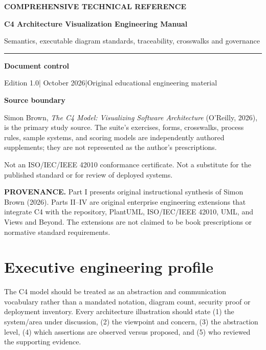 \documentclass[10pt,letterpaper]{article}
\newcommand{\SourceNote}[1]{\par\smallskip\noindent\colorbox{C4Light}{\parbox{0.94\linewidth}{\footnotesize\textbf{PROVENANCE.} #1}}\par\medskip}
\newcommand{\DocStart}[3]{%
\begin{document}
\begin{titlepage}
\renewcommand{\thepage}{title-\arabic{page}}
\vspace*{0.55in}
{\sffamily\bfseries\small\color{C4Teal}#1}\par\vspace{0.24in}
{\sffamily\bfseries\fontsize{26}{31}\selectfont\color{C4Navy}#2}\par\vspace{0.18in}
{\large\color{C4Gray}#3}\par\vspace{0.4in}
\textcolor{C4Teal}{\rule{\linewidth}{1.15pt}}\par\vspace{0.24in}
\textbf{Document control}\par
Edition 1.0\quad|\quad 30 October 2026\quad|\quad Original educational engineering material\par
\vspace{0.17in}
\textbf{Source boundary}\par
Simon Brown, \emph{The C4 Model: Visualizing Software Architecture} (O'Reilly, 2026), is the primary study source. The suite's exercises, forms, crosswalks, process rules, sample systems, and scoring models are independently authored supplements; they are not represented as the author's prescriptions.\par
\vfill
{\small\color{C4Gray}Not an ISO/IEC/IEEE 42010 conformance certificate. Not a substitute for the published standard or for review of deployed systems.}\par
\end{titlepage}
}
\DocStart{COMPREHENSIVE TECHNICAL REFERENCE}{C4 Architecture Visualization Engineering Manual}{Semantics, executable diagram standards, traceability, crosswalks and governance}
\tableofcontents\clearpage
\SourceNote{Part I presents original instructional synthesis of Simon Brown (2026). Parts II--IV are original enterprise engineering extensions that integrate C4 with the repository, PlantUML, ISO/IEC/IEEE 42010, UML, and Views and Beyond. The extensions are not claimed to be book prescriptions or normative standard requirements.}
\section{Executive engineering profile}
The C4 model should be treated as an abstraction and communication vocabulary rather than a mandated notation, diagram count, security proof or deployment inventory. Every architecture illustration should state (1) the system/area under discussion, (2) the viewpoint and concern, (3) the abstraction level, (4) which assertions are observed versus proposed, and (5) who reviewed the supporting evidence.
\end{document}
